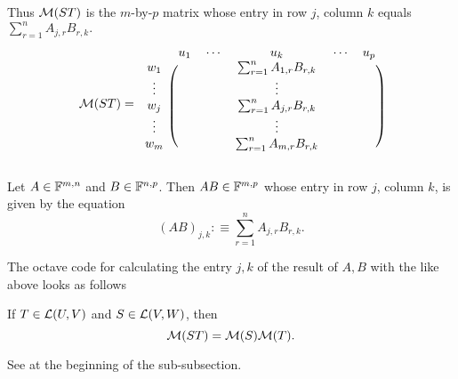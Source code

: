 \begin{minipage}{\linewidth-40pt}
  Thus $\mathcal{M}(ST)$ is  the $m$-by-$p$ matrix whose entry in row $j$, column $k$ equals
  $\sum_{r=1}^{n} A_{j,r}  B_{r,k}.$
\begin{equation}
  \mathcal{M} (ST) =
  \begin{blockarray}{cccccc}
             & u_1 & \cdots &  u_k      & \cdots & u_p \\
    \begin{block}{c(ccccc)}
      w_1    &     &        &
        \sum_{r=1}^{n} A_{1,r}  B_{r,k} &        &     \\
      \vdots &     &        &  \vdots   &        &     \\
      w_j    &     &        &
        \sum_{r=1}^{n} A_{j,r}  B_{r,k} &        &     \\
      \vdots &     &        &  \vdots   &        &     \\
      w_m    &     &        &
        \sum_{r=1}^{n} A_{m,r}  B_{r,k} &        &     \\
    \end{block}
  \end{blockarray}
\end{equation}
\end{minipage}


\setcounter{thm}{40}
\begin{mydef} 
  \label{def: matrix multiplication}
  Let $A \in \mathbb{F}^{m,n}$ and $B \in \mathbb{F}^{n,p}$. Then $AB \in \mathbb{F}^{m,p}$ whose entry in row $j$, column $k$, is given by the equation
  \begin{equation}
    (AB)_{j,k} :\equiv \sum_{r=1}^{n} A_{j,r} B_{r,k}.
  \end{equation} %
  \begin{minipage}{\linewidth}
    The octave code for calculating the entry $j,k$ of the result of $A, B$ with the  like above looks as follows

  \end{minipage}
\end{mydef}

\setcounter{thm}{42}
\begin{thm}
  If $T \in \mathcal{L}(U,V)$ and $S\in \mathcal{L}(V,W)$, then
  \begin{equation}
    \mathcal{M}(ST) = \mathcal{M}(S) \mathcal{M}(T).
  \end{equation}
\end{thm}
\begin{prf}
  See at the beginning of the sub-subsection.
\end{prf}

